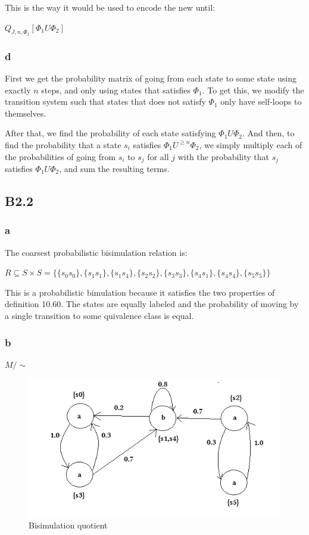 This is the way it would be used to encode the new until:

$Q_{J, n, \Phi_1} [\Phi_1 U \Phi_2]$

\subsubsection{d}

First we get the probability matrix of going from each state to
some state using exactly $n$ steps,
and only using states that satisfies $\Phi_1$.
To get this, we modify the transition system such that states that does not satisfy
$\Phi_1$ only have self-loops to themselves.

After that, we find the probability of each state satisfying $\Phi_1 U \Phi_2$.
And then, to find the probability that a state $s_i$ satisfies $\Phi_1 U^{\geq n} \Phi_2$,
we simply multiply each of the probabilities of going from $s_i$ to $s_j$ for all $j$ with
the probability that $s_j$ satisfies $\Phi_1 U \Phi_2$, and sum the resulting terms.

\subsection{B2.2}

\subsubsection{a}

The coarsest probabilistic bisimulation relation is:

$R \subseteq S \times S = \{\{s_0s_0\}, \{s_1s_1\}, \{s_1s_4\}, \{s_2s_2\}, \{s_3s_3\}, \{s_4s_1\}, \{s_4s_4\}, \{s_5s_5\}\}$

This is a probabilistic bimulation because it satisfies the two properties of definition 10.60. The states are equally labeled and the probability of moving by a single transition to some quivalence class is equal.

\subsubsection{b}

$M/\sim$

\begin{figure}[!htb]
\centering
\includegraphics{images/bisimulation}
\caption{Bisimulation quotient}
\end{figure}

